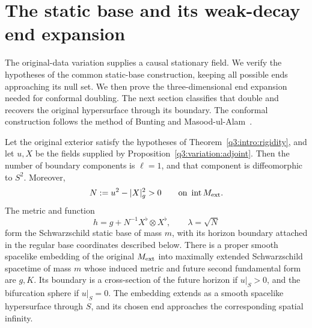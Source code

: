 \section{The static base and its weak-decay end expansion}
\label{q3:static:section}

The original-data variation supplies a causal stationary field. We
verify the hypotheses of the common static-base construction, keeping
all possible ends approaching its null set. We then prove the
three-dimensional end expansion needed for conformal doubling.
The next section classifies that double and recovers the original
hypersurface through its boundary. The conformal construction follows
the method of Bunting and Masood-ul-Alam~\cite{BuntingMasoodUlAlam1987}.

\begin{proposition}
\label{q3:static:classification}
Let the original exterior satisfy the hypotheses of
Theorem~\ref{q3:intro:rigidity}, and let \(u,X\) be the fields supplied by
Proposition~\ref{q3:variation:adjoint}.
Then the number of boundary components is $\ell=1$, and that
component is diffeomorphic to $S^2$. Moreover,
\[
N:=u^2-|X|_g^2>0
\qquad\text{on }\operatorname{int}M_{\mathrm{ext}}.
\]
The metric and function
\[
h=g+N^{-1}X^\flat\otimes X^\flat,\qquad \lambda=\sqrt N
\]
form the Schwarzschild static base of mass \(m\), with its horizon
boundary attached in the regular base coordinates described below.
There is a proper smooth spacelike embedding of the original
\(M_{\mathrm{ext}}\) into maximally extended Schwarzschild spacetime of mass \(m\)
whose induced metric and future second fundamental form are \(g,K\).
Its boundary is a cross-section of the future horizon if \(u|_S>0\),
and the bifurcation sphere if \(u|_S=0\).
The embedding extends as a smooth spacelike hypersurface through \(S\),
and its chosen end approaches the corresponding spatial infinity.
\end{proposition}

